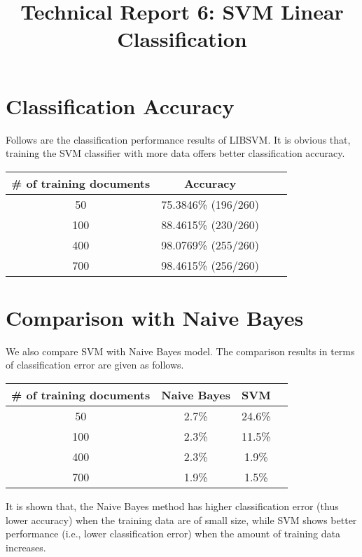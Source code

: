 \documentclass[10pt,a4paper]{article}
\date{}
\begin{document}
\title{Technical Report 6: SVM Linear Classification}

\maketitle

\section{Classification Accuracy}
%
  Follows are the classification performance results of LIBSVM. It is obvious that, training the SVM classifier with more data offers better classification accuracy.
  \begin{table}[htb]
    \begin{center}
     \begin{tabular}{|c|c|c|c|} \hline
       \# of training documents          & Accuracy            \\ \hline
       50                                & 75.3846\% (196/260) \\ \hline
       100                               & 88.4615\% (230/260) \\ \hline
       400                               & 98.0769\% (255/260) \\ \hline
       700                               & 98.4615\% (256/260) \\ \hline
     \end{tabular}
    \end{center}
    \label{tab:norm}
    \end{table}


\section{Comparison with Naive Bayes}
%
  We also compare SVM with Naive Bayes model. The comparison results in terms of classification error are given as follows.
    \begin{table}[htb]
    \begin{center}
     \begin{tabular}{|c|c|c|c|} \hline
       \# of training documents & Naive Bayes   & SVM \\ \hline
       50                       & 2.7\%         & 24.6\% \\ \hline
       100                      & 2.3\%         & 11.5\% \\ \hline
       400                      & 2.3\%         & 1.9\% \\ \hline
       700                      & 1.9\%         & 1.5\% \\ \hline
     \end{tabular}
    \end{center}
    \label{tab:norm}
    \end{table}
  It is shown that, the Naive Bayes method has higher classification error (thus lower accuracy) when the training data are of small size, while SVM shows better performance (i.e., lower classification error) when the amount of training data increases.
\end{document}
